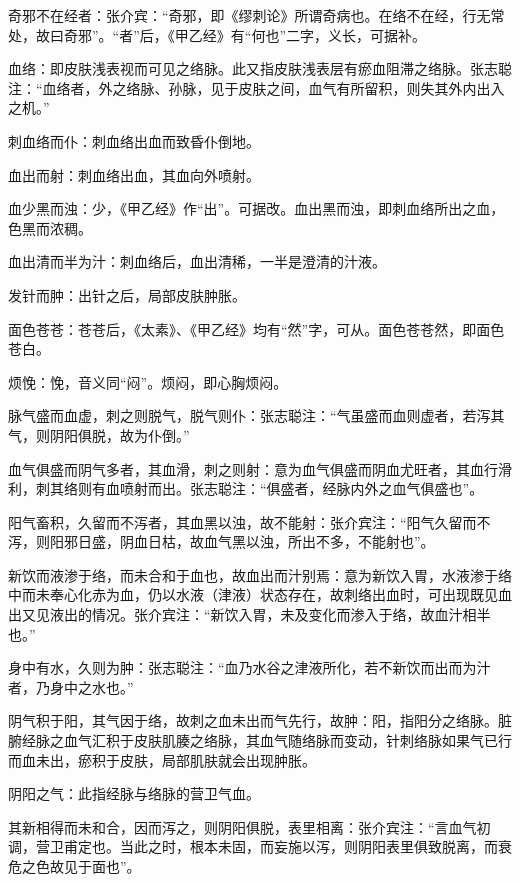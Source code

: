 \documentclass[12pt]{ctexbook}%
\begin{document}

\begin{jiaozhu}
	\item 奇邪不在经者：张介宾：“奇邪，即《缪刺论》所谓奇病也。在络不在经，行无常处，故曰奇邪”。“者”后，《甲乙经》有“何也”二字，义长，可据补。
	\item 血络：即皮肤浅表视而可见之络脉。此又指皮肤浅表层有瘀血阻滞之络脉。张志聪注：“血络者，外之络脉、孙脉，见于皮肤之间，血气有所留积，则失其外内出入之机。”
	\item 刺血络而仆：刺血络出血而致昏仆倒地。
	\item 血出而射：刺血络出血，其血向外喷射。
	\item 血少黑而浊：少，《甲乙经》作“出”。可据改。血出黑而浊，即刺血络所出之血，色黑而浓稠。
	\item 血出清而半为汁：刺血络后，血出清稀，一半是澄清的汁液。
	\item 发针而肿：出针之后，局部皮肤肿胀。
	\item 面色苍苍：苍苍后，《太素》、《甲乙经》均有“然”字，可从。面色苍苍然，即面色苍白。
	\item 烦悗：悗，音义同“闷”。烦闷，即心胸烦闷。
	\item 脉气盛而血虚，刺之则脱气，脱气则仆：张志聪注：“气虽盛而血则虚者，若泻其气，则阴阳俱脱，故为仆倒。”
	\item 血气俱盛而阴气多者，其血滑，刺之则射：意为血气俱盛而阴血尤旺者，其血行滑利，刺其络则有血喷射而出。张志聪注：“俱盛者，经脉内外之血气俱盛也”。
	\item 阳气畜积，久留而不泻者，其血黑以浊，故不能射：张介宾注：“阳气久留而不泻，则阳邪日盛，阴血日枯，故血气黑以浊，所出不多，不能射也”。
	\item 新饮而液渗于络，而未合和于血也，故血出而汁别焉：意为新饮入胃，水液渗于络中而未奉心化赤为血，仍以水液（津液）状态存在，故刺络出血时，可出现既见血出又见液出的情况。张介宾注：“新饮入胃，未及变化而渗入于络，故血汁相半也。”
	\item 身中有水，久则为肿：张志聪注：“血乃水谷之津液所化，若不新饮而出而为汁者，乃身中之水也。”
	\item 阴气积于阳，其气因于络，故刺之血未出而气先行，故肿：阳，指阳分之络脉。脏腑经脉之血气汇积于皮肤肌腠之络脉，其血气随络脉而变动，针刺络脉如果气已行而血未出，瘀积于皮肤，局部肌肤就会出现肿胀。
	\item 阴阳之气：此指经脉与络脉的营卫气血。
	\item 其新相得而未和合，因而泻之，则阴阳俱脱，表里相离：张介宾注：“言血气初调，营卫甫定也。当此之时，根本未固，而妄施以泻，则阴阳表里俱致脱离，而衰危之色故见于面也”。

\end{jiaozhu}
\end{document}
